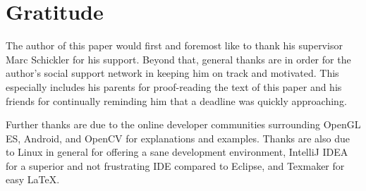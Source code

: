 \section*{Gratitude}

The author of this paper would first and foremost like to thank his supervisor Marc Schickler for his support.
Beyond that, general thanks are in order for the author's social support network in keeping him on track and motivated.
This especially includes his parents for proof-reading the text of this paper and his friends for continually reminding him that a deadline was quickly approaching.

Further thanks are due to the online developer communities surrounding OpenGL ES, Android, and OpenCV for explanations and examples.
Thanks are also due to Linux in general for offering a sane development environment, IntelliJ IDEA for a superior and not frustrating IDE compared to Eclipse, and Texmaker for easy \LaTeX .
